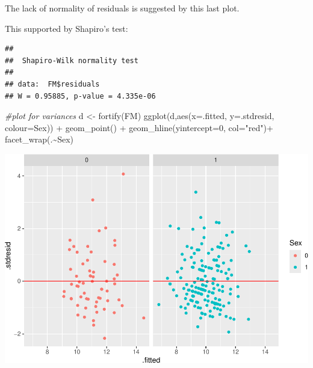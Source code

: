 \documentclass[
]{article}
\newenvironment{Shaded}{\begin{snugshade}}{\end{snugshade}}
\newcommand{\AttributeTok}[1]{\textcolor[rgb]{0.77,0.63,0.00}{#1}}
\newcommand{\CommentTok}[1]{\textcolor[rgb]{0.56,0.35,0.01}{\textit{#1}}}
\newcommand{\DecValTok}[1]{\textcolor[rgb]{0.00,0.00,0.81}{#1}}
\newcommand{\FunctionTok}[1]{\textcolor[rgb]{0.00,0.00,0.00}{#1}}
\newcommand{\NormalTok}[1]{#1}
\newcommand{\OtherTok}[1]{\textcolor[rgb]{0.56,0.35,0.01}{#1}}
\newcommand{\SpecialCharTok}[1]{\textcolor[rgb]{0.00,0.00,0.00}{#1}}
\newcommand{\StringTok}[1]{\textcolor[rgb]{0.31,0.60,0.02}{#1}}
\begin{document}
The lack of normality of residuals is suggested by this last plot.

This supported by Shapiro's test:

\begin{Shaded}
\end{Shaded}

\begin{verbatim}
## 
##  Shapiro-Wilk normality test
## 
## data:  FM$residuals
## W = 0.95885, p-value = 4.335e-06
\end{verbatim}

\begin{Shaded}
\begin{Highlighting}[]
\CommentTok{\#plot for variances}
\NormalTok{d }\OtherTok{\textless{}{-}} \FunctionTok{fortify}\NormalTok{(FM)}
\FunctionTok{ggplot}\NormalTok{(d,}\FunctionTok{aes}\NormalTok{(}\AttributeTok{x=}\NormalTok{.fitted, }\AttributeTok{y=}\NormalTok{.stdresid, }\AttributeTok{colour=}\NormalTok{Sex)) }\SpecialCharTok{+}
  \FunctionTok{geom\_point}\NormalTok{() }\SpecialCharTok{+}
  \FunctionTok{geom\_hline}\NormalTok{(}\AttributeTok{yintercept=}\DecValTok{0}\NormalTok{, }\AttributeTok{col=}\StringTok{"red"}\NormalTok{)}\SpecialCharTok{+}
  \FunctionTok{facet\_wrap}\NormalTok{(.}\SpecialCharTok{\textasciitilde{}}\NormalTok{Sex)}
\end{Highlighting}
\end{Shaded}

\includegraphics{Real_data_CAPE_Negative_code_files/figure-latex/unnamed-chunk-9-1.pdf}
\end{document}

